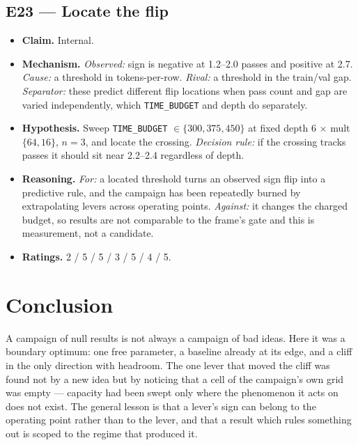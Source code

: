 \documentclass{article}
\begin{document}
\subsection{E23 --- Locate the flip}
\begin{itemize}\itemsep2pt
\item \textbf{Claim.} Internal.
\item \textbf{Mechanism.} \emph{Observed:} sign is negative at 1.2--2.0 passes and positive at 2.7. \emph{Cause:} a threshold in tokens-per-row. \emph{Rival:} a threshold in the train/val gap. \emph{Separator:} these predict different flip locations when pass count and gap are varied independently, which \texttt{TIME\_BUDGET} and depth do separately.
\item \textbf{Hypothesis.} Sweep \texttt{TIME\_BUDGET} $\in\{300,375,450\}$ at fixed depth 6 $\times$ mult $\{64,16\}$, $n{=}3$, and locate the crossing. \emph{Decision rule:} if the crossing tracks passes it should sit near 2.2--2.4 regardless of depth.
\item \textbf{Reasoning.} \emph{For:} a located threshold turns an observed sign flip into a predictive rule, and the campaign has been repeatedly burned by extrapolating levers across operating points. \emph{Against:} it changes the charged budget, so results are not comparable to the frame's gate and this is measurement, not a candidate.
\item \textbf{Ratings.} 2 / 5 / 5 / 3 / 5 / 4 / 5.
\end{itemize}

\section{Conclusion}
A campaign of null results is not always a campaign of bad ideas. Here it was a boundary optimum: one free parameter, a baseline already at its edge, and a cliff in the only direction with headroom. The one lever that moved the cliff was found not by a new idea but by noticing that a cell of the campaign's own grid was empty --- capacity had been swept only where the phenomenon it acts on does not exist. The general lesson is that a lever's sign can belong to the operating point rather than to the lever, and that a result which rules something out is scoped to the regime that produced it.
\end{document}
